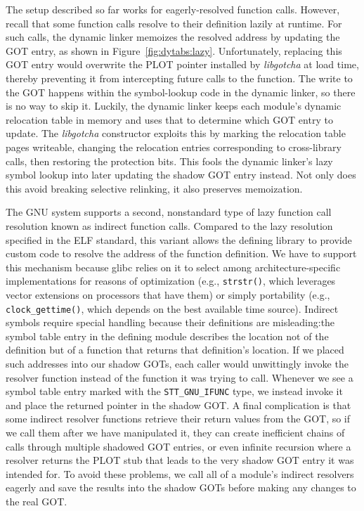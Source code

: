 The setup described so far works for eagerly-resolved function calls.  However,
recall that some function calls resolve to their definition lazily at runtime.  For
such calls, the dynamic linker memoizes the resolved address by updating the GOT
entry, as shown in Figure~\ref{fig:dytabs:lazy}.  Unfortunately, replacing this GOT
entry would overwrite the PLOT pointer installed by \textit{libgotcha} at load time,
thereby preventing it from intercepting future calls to the function.  The write to
the GOT happens within the symbol-lookup code in the dynamic linker, so there is no
way to skip it.  Luckily, the dynamic linker keeps each module's dynamic relocation
table in memory and uses that to determine which GOT entry to update.  The
\textit{libgotcha} constructor exploits this by marking the relocation table pages
writeable, changing the relocation entries corresponding to cross-library calls, then
restoring the protection bits.  This fools the dynamic linker's lazy symbol lookup
into later updating the shadow GOT entry instead.  Not only does this avoid breaking
selective relinking, it also preserves memoization.

The GNU system supports a second, nonstandard type of lazy function call resolution
known as indirect function calls.  Compared to the lazy resolution specified in the
ELF standard, this variant allows the defining library to provide custom code to
resolve the address of the function definition.  We have to support this mechanism
because glibc relies on it to select among architecture-specific implementations for
reasons of optimization (e.g., \texttt{strstr()}, which leverages vector extensions
on processors that have them) or simply portability (e.g., \texttt{clock\_gettime()},
which depends on the best available time source).  Indirect symbols require special
handling because their definitions are misleading:\@ the symbol table entry in the
defining module describes the location not of the definition but of a function that
returns that definition's location.  If we placed such addresses into our shadow
GOTs, each caller would unwittingly invoke the resolver function instead of the
function it was trying to call.  Whenever we see a symbol table entry marked with the
\texttt{STT\_GNU\_IFUNC} type, we instead invoke it and place the returned pointer in
the shadow GOT.  A final complication is that some indirect resolver functions
retrieve their return values from the GOT, so if we call them after we have
manipulated it, they can create inefficient chains of calls through multiple shadowed
GOT entries, or even infinite recursion where a resolver returns the PLOT stub that
leads to the very shadow GOT entry it was intended for.  To avoid these problems, we
call all of a module's indirect resolvers eagerly and save the results into the
shadow GOTs before making any changes to the real GOT.


